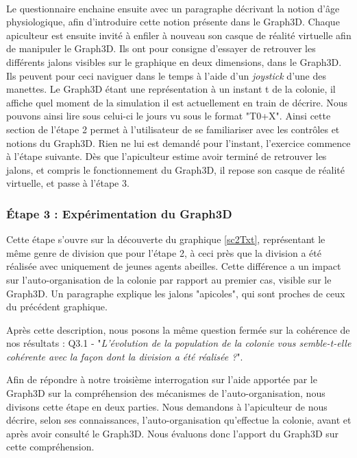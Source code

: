 		\paragraph{}
		Le questionnaire enchaine ensuite avec un paragraphe décrivant la notion d'âge physiologique, afin d'introduire cette notion présente dans le Graph3D. Chaque apiculteur est ensuite invité à enfiler à nouveau son casque de réalité virtuelle afin de manipuler le Graph3D. Ils ont pour consigne d'essayer de retrouver les différents jalons visibles sur le graphique en deux dimensions, dans le Graph3D. Ils peuvent pour ceci naviguer dans le temps à l'aide d'un \textit{joystick} d'une des manettes. Le Graph3D étant une représentation à un instant t de la colonie, il affiche quel moment de la simulation il est actuellement en train de décrire. Nous pouvons ainsi lire sous celui-ci le jours vu sous le format "T0+X". Ainsi cette section de l'étape 2 permet à l'utilisateur de se familiariser avec les contrôles et notions du Graph3D. Rien ne lui est demandé pour l'instant, l'exercice commence à l'étape suivante. Dès que l'apiculteur estime avoir terminé de retrouver les jalons, et compris le fonctionnement du Graph3D, il repose son casque de réalité virtuelle, et passe à l'étape 3.
		
		\subsubsection{Étape 3 : Expérimentation du Graph3D}
			Cette étape s'ouvre sur la découverte du graphique \ref{sc2Txt}, représentant le même genre de division que pour l'étape 2, à ceci près que la division a été réalisée avec uniquement de jeunes agents abeilles. Cette différence a un impact sur l'auto-organisation de la colonie par rapport au premier cas, visible sur le Graph3D. Un paragraphe explique les jalons "apicoles", qui sont proches de ceux du précédent graphique.
			
			Après cette description, nous posons la même question fermée sur la cohérence de nos résultats : Q3.1 - "\textit{L'évolution de la population de la colonie vous semble-t-elle cohérente avec la façon dont la division a été réalisée ?}".
			
			Afin de répondre à notre troisième interrogation sur l'aide apportée par le Graph3D sur la compréhension des mécanismes de l'auto-organisation, nous divisons cette étape en deux parties. Nous demandons à l'apiculteur de nous décrire, selon ses connaissances, l'auto-organisation qu'effectue la colonie, avant et après avoir consulté le Graph3D. Nous évaluons donc l'apport du Graph3D sur cette compréhension.
			
